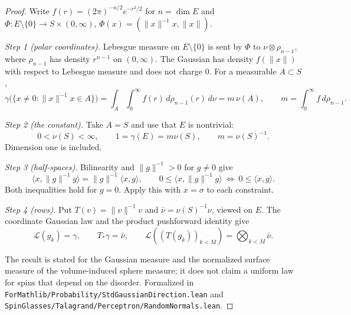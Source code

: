 \begin{proof}
  \leanok
Write $f(r)=(2\pi)^{-n/2}e^{-r^2/2}$ for $n=\dim E$ and $\Phi:E\setminus\{0\}\to S\times(0,\infty)$,
$\Phi(x)=(\|x\|^{-1}x,\|x\|)$.

\emph{Step 1 (polar coordinates).} Lebesgue measure on $E\setminus\{0\}$ is sent by $\Phi$ to
$\nu\otimes\rho_{n-1}$, where $\rho_{n-1}$ has density $r^{n-1}$ on $(0,\infty)$. The Gaussian has density
$f(\|x\|)$ with respect to Lebesgue measure and does not charge $0$. For a measurable $A\subset S$,
\[
\gamma\bigl(\{x\ne0:\|x\|^{-1}x\in A\}\bigr)=\int_A\int_0^\infty f(r)\,d\rho_{n-1}(r)\,d\nu=m\,\nu(A),
\qquad m=\int_0^\infty f\,d\rho_{n-1}.
\]

\emph{Step 2 (the constant).} Take $A=S$ and use that $E$ is nontrivial:
\[
 0<\nu(S)<\infty,\qquad 1=\gamma(E)=m\nu(S),\qquad m=\nu(S)^{-1}.
\]
Dimension one is included.

\emph{Step 3 (half-spaces).} Bilinearity and $\|g\|^{-1}>0$ for $g\ne0$ give
\[
 \langle x,\|g\|^{-1}g\rangle=\|g\|^{-1}\langle x,g\rangle,\qquad
 0\le\langle x,\|g\|^{-1}g\rangle\ \Longleftrightarrow\ 0\le\langle x,g\rangle.
\]
Both inequalities hold for $g=0$. Apply this with $x=\sigma$ to each constraint.

\emph{Step 4 (rows).} Put $T(v)=\|v\|^{-1}v$ and $\bar\nu=\nu(S)^{-1}\nu$, viewed on $E$.
The coordinate Gaussian law and the product pushforward identity give
\[
 \mathcal L(g_k)=\gamma,\qquad T_*\gamma=\bar\nu,\qquad
 \mathcal L((T(g_k))_{k<M})=\bigotimes_{k<M}\bar\nu.
\]

The result is stated for the Gaussian measure and the normalized surface measure of the volume-induced
sphere measure; it does not claim a uniform law for spins that depend on the disorder. Formalized in
\texttt{ForMathlib/Probability/StdGaussianDirection.lean} and
\texttt{SpinGlasses/Talagrand/Perceptron/RandomNormals.lean}.
\end{proof}

